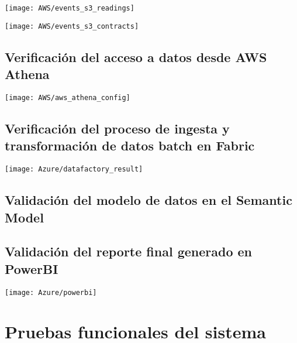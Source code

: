 \begin{center}
   \texttt{[image: AWS/events\_s3\_readings]}
   \label{fig:events_s3_readings}
\end{center}


\begin{center}
   \texttt{[image: AWS/events\_s3\_contracts]}
   \label{fig:events_s3_contracts}
\end{center}


\subsection{Verificación del acceso a datos desde AWS Athena}



\begin{center}
   \texttt{[image: AWS/aws\_athena\_config]}
   \label{fig:aws_athena_config}
\end{center}





\subsection{Verificación del proceso de ingesta y transformación de datos batch en Fabric}


\begin{center}
   \texttt{[image: Azure/datafactory\_result]}
   \label{fig:powerbi1}
\end{center}
 

\subsection{Validación del modelo de datos en el Semantic Model}

\subsection{Validación del reporte final generado en PowerBI}

\begin{center}
   \texttt{[image: Azure/powerbi]}
   \label{fig:powerbi1}
\end{center}
 

\section{Pruebas funcionales del sistema}
